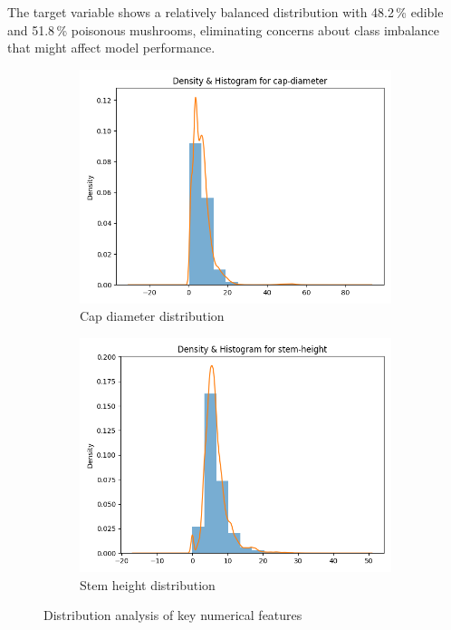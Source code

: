 \documentclass[11pt,a4paper]{article}
\begin{document}
The target variable shows a relatively balanced distribution with 48.2\,\% edible and 51.8\,\% poisonous mushrooms, eliminating concerns about class imbalance that might affect model performance.

\begin{figure}[H]
    \centering
    \begin{subfigure}{0.48\textwidth}
        \includegraphics[width=\textwidth]{figures/eda_dist_cap-diameter.png}
        \caption{Cap diameter distribution}
    \end{subfigure}
    \hfill
    \begin{subfigure}{0.48\textwidth}
        \includegraphics[width=\textwidth]{figures/eda_dist_stem-height.png}
        \caption{Stem height distribution}
    \end{subfigure}
    \caption{Distribution analysis of key numerical features}
    \label{fig:numerical_distributions}
\end{figure}
\end{document}
